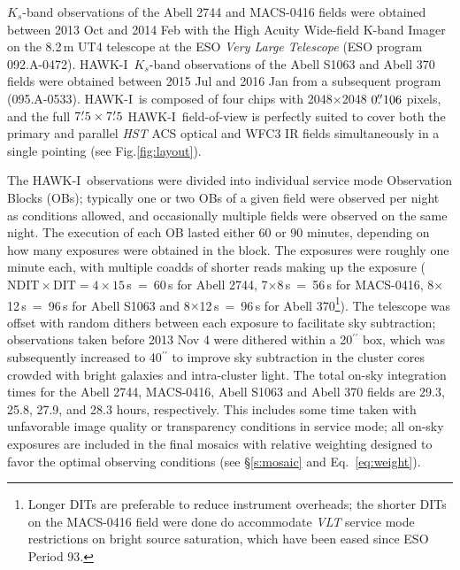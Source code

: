 \documentclass[preprint2]{aastex6}
\gdef\HAWKI{\mbox{HAWK-I}}
\begin{document}
$K_s$-band observations of the Abell 2744 and MACS-0416 fields were obtained between 2013 Oct and 2014 Feb with the High Acuity Wide-field K-band Imager \citep[\HAWKI;][]{hawki, hawki2} on the 8.2\,m UT4 telescope at the ESO \textit{Very Large Telescope} (ESO program \mbox{092.A-0472}).  \HAWKI\ $K_s$-band observations of the Abell S1063 and Abell 370 fields were obtained between 2015 Jul and 2016 Jan from a subsequent program (095.A-0533).  \HAWKI\ is composed of four chips with 2048$\times$2048 $0\mbox{$.\!\!^{\prime\prime}$}106$ pixels, and the full $7\mbox{$.\mkern-4mu^\prime$}5\times7\mbox{$.\mkern-4mu^\prime$}5$ \HAWKI\ field-of-view is perfectly suited to cover both the primary and parallel \textit{HST} ACS optical and WFC3 IR fields simultaneously in a single pointing (see Fig.\ref{fig:layout}).

The \HAWKI\ observations were divided into individual service mode Observation Blocks (OBs); typically one or two OBs of a given field were observed per night as conditions allowed, and occasionally multiple fields were observed on the same night.  The execution of each OB lasted either 60 or 90 minutes, depending on how many exposures were obtained in the block.  The exposures were roughly one minute each, with multiple coadds of shorter reads making up the exposure ($\mathrm{NDIT}\times\mathrm{DIT} = 4\times15$\,s~=~60\,s for Abell 2744, 7$\times$8\,s~=~56\,s for MACS-0416, 8$\times$12\,s~=~96\,s for Abell S1063 and 8$\times$12\,s~=~96\,s for Abell 370\footnote{Longer DITs are preferable to reduce instrument overheads; the shorter DITs on the MACS-0416 field were done do accommodate \textit{VLT} service mode restrictions on bright source saturation, which have been eased since ESO Period 93.}).  The telescope was offset with random dithers between each exposure to facilitate sky subtraction;  observations taken before 2013 Nov 4 were dithered within a 20$^{\prime\prime}$ box, which was subsequently increased to 40$^{\prime\prime}$ to improve sky subtraction in the cluster cores crowded with bright galaxies and intra-cluster light.  The total on-sky integration times for the Abell 2744, MACS-0416, Abell S1063 and Abell 370 fields are 29.3, 25.8, 27.9, and 28.3 hours, respectively.  This includes some time taken with unfavorable image quality or transparency conditions in service mode;  all on-sky exposures are included in the final mosaics with relative weighting designed to favor the optimal observing conditions (see \S\ref{s:mosaic} and Eq.~\ref{eq:weight}).
\end{document}
